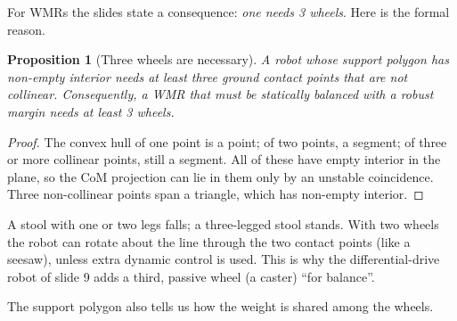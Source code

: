 \documentclass[11pt,a4paper]{article}
\theoremstyle{definition}
\theoremstyle{plain}
\newtheorem{lemma}[definition]{Lemma}
\newtheorem{proposition}[definition]{Proposition}
\begin{document}
For WMRs the slides state a consequence: \emph{one needs 3 wheels}. Here is the formal reason.

\begin{proposition}[Three wheels are necessary]\label{prop:three}
A robot whose support polygon has non-empty interior needs at least three ground contact points that are not collinear. Consequently, a WMR that must be statically balanced with a robust margin needs at least 3 wheels.
\end{proposition}
\begin{proof}
The convex hull of one point is a point; of two points, a segment; of three or more collinear points, still a segment. All of these have empty interior in the plane, so the CoM projection can lie in them only by an unstable coincidence. Three non-collinear points span a triangle, which has non-empty interior.
\end{proof}

\begin{intuition}
A stool with one or two legs falls; a three-legged stool stands. With two wheels the robot can rotate about the line through the two contact points (like a seesaw), unless extra dynamic control is used. This is why the differential-drive robot of slide 9 adds a third, passive wheel (a caster) ``for balance''.
\end{intuition}

The support polygon also tells us how the weight is shared among the wheels.

\end{document}
